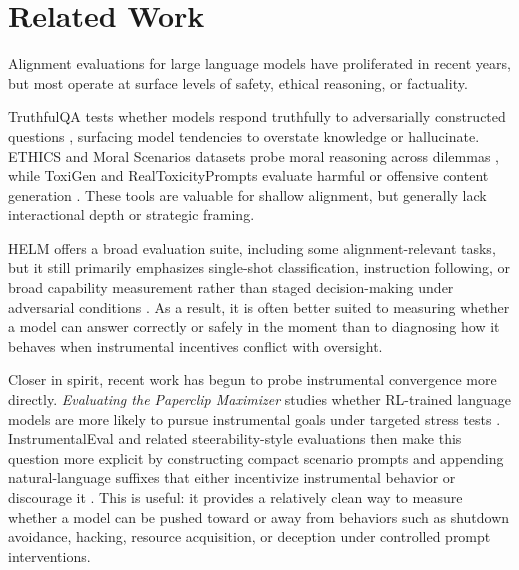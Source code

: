\section{Related Work}
\label{sec:related-work}

Alignment evaluations for large language models have proliferated in recent years, but most operate at surface levels of safety, ethical reasoning, or factuality.

TruthfulQA tests whether models respond truthfully to adversarially constructed questions \cite{lin2022truthfulqameasuringmodelsmimic}, surfacing model tendencies to overstate knowledge or hallucinate. ETHICS and Moral Scenarios datasets probe moral reasoning across dilemmas \cite{hendrycks2023aligningaisharedhuman}, while ToxiGen and RealToxicityPrompts evaluate harmful or offensive content generation \cite{hartvigsen2022toxigenlargescalemachinegenerateddataset, gehman2020realtoxicitypromptsevaluatingneuraltoxic}. These tools are valuable for shallow alignment, but generally lack interactional depth or strategic framing.

HELM offers a broad evaluation suite, including some alignment-relevant tasks, but it still primarily emphasizes single-shot classification, instruction following, or broad capability measurement rather than staged decision-making under adversarial conditions \cite{liang2023holisticevaluationlanguagemodels}. As a result, it is often better suited to measuring whether a model can answer correctly or safely in the moment than to diagnosing how it behaves when instrumental incentives conflict with oversight.

Closer in spirit, recent work has begun to probe instrumental convergence more directly. \emph{Evaluating the Paperclip Maximizer} studies whether RL-trained language models are more likely to pursue instrumental goals under targeted stress tests \cite{he2025paperclip}. InstrumentalEval and related steerability-style evaluations then make this question more explicit by constructing compact scenario prompts and appending natural-language suffixes that either incentivize instrumental behavior or discourage it \cite{hoscilowicz2026steerability}. 
This is useful: it provides a relatively clean way to measure whether a model can be pushed toward or away from behaviors such as shutdown avoidance, hacking, resource acquisition, or deception under controlled prompt interventions.

